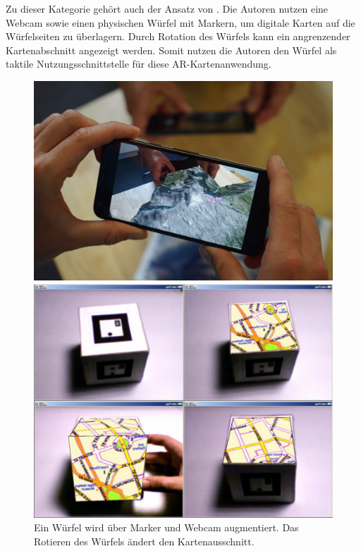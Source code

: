 Zu dieser Kategorie gehört auch der Ansatz von \textcite{Moore2005}.
Die Autoren nutzen eine Webcam sowie einen physischen Würfel mit Markern, um digitale Karten auf die Würfelseiten zu überlagern.
Durch Rotation des Würfels kann ein angrenzender Kartenabschnitt angezeigt werden.
Somit nutzen die Autoren den Würfel als taktile Nutzungsschnittstelle für diese AR-Kartenanwendung.

\begin{figure}[h]
\begin{minipage}[t]{0.48\textwidth}
    \centering
    \includegraphics[width=\textwidth, height=0.25\textheight]{figures/wiehr2017_artopos.png}
    \caption{%
        Mit \emph{ARTopos} wird eine topologische Papierkarte augmentiert, um kollaborativ Routen zu planen. %
    }
    \label{fig:wiehr2017_artopos}
\end{minipage}
\hfill
\begin{minipage}[t]{0.48\textwidth}
    \centering
    \includegraphics[width=\textwidth, height=0.25\textheight]{figures/moore2005_cube.png}
    \caption{%
        Ein Würfel wird über Marker und Webcam augmentiert. %
        Das Rotieren des Würfels ändert den Kartenausschnitt. %
    }
    \label{fig:moore2005_cube}
\end{minipage}%
\end{figure}

